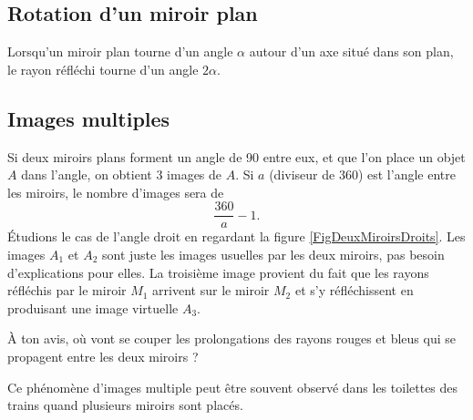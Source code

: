 \subsection{Rotation d'un miroir plan}

Lorsqu'un miroir plan tourne d'un angle $\alpha$ autour d'un axe situé dans son plan, le rayon réfléchi tourne d'un angle $2\alpha$.

\subsection{Images multiples}

Si deux miroirs plans forment un angle de \unit{90}{\degree} entre eux, et que l'on place un objet $A$ dans l'angle, on obtient 3 images de $A$. Si $a$ (diviseur de \unit{360}{\degree}) est l'angle entre les miroirs, le nombre d'images sera de
\[ 
  \frac{ 360 }{ a }-1.
\]
Étudions le cas de l'angle droit en regardant la figure \ref{FigDeuxMiroirsDroits}. Les images $A_{1}$ et $A_{2}$ sont juste les images usuelles par les deux miroirs, pas besoin d'explications pour elles. La troisième image provient du fait que les rayons réfléchis par le miroir $M_{1}$ arrivent sur le miroir $M_{2}$ et s'y réfléchissent en produisant une image virtuelle $A_{3}$.

À ton avis, où vont se couper les prolongations des rayons rouges et bleus qui se propagent entre les deux miroirs ?

Ce phénomène d'images multiple peut être souvent observé dans les toilettes des trains quand plusieurs miroirs sont placés.


